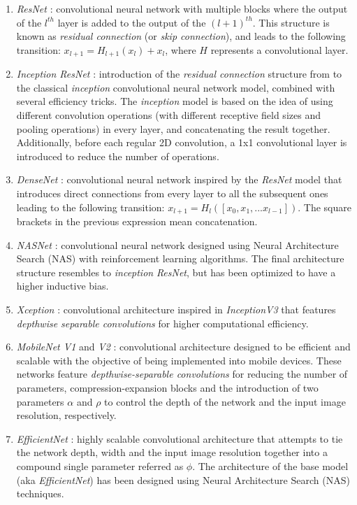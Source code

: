 \documentclass{elsarticle}
\begin{document}
    \begin{enumerate}
    	\item \textit{ResNet} \citep{he2016}: convolutional neural network with multiple blocks where the output of the $l^{th}$ layer is added to the output of the $(l+1)^{th}$. This structure is known as \textit{residual connection} (or \textit{skip connection}), and leads to the following transition: $x_{l+1} = H_{l+1}(x_{l}) + x_l$, where $H$ represents a convolutional layer.
	   	\item \textit{Inception ResNet} \citep{szegedy2017}: introduction of the \textit{residual connection} structure from \citep{he2016} to the classical \textit{inception} convolutional neural network model, combined with several efficiency tricks. The \textit{inception} model is based on the idea of using different convolution operations (with different receptive field sizes and pooling operations) in every layer, and concatenating the result together. Additionally, before each regular 2D convolution, a 1x1 convolutional layer is introduced to reduce the number of operations.
    	\item \textit{DenseNet} \citep{huang2017}: convolutional neural network inspired by the \textit{ResNet} model \citep{he2016} that introduces direct connections from every layer to all the subsequent ones leading to the following transition: $x_{l+1} = H_l([x_0, x_1, ... x_{l-1}])$. The square brackets in the previous expression mean concatenation.
    	\item \textit{NASNet} \citep{pham2018}: convolutional neural network designed using Neural Architecture Search (NAS) with reinforcement learning algorithms. The final architecture structure resembles to \textit{inception} \textit{ResNet}, but has been optimized to have a higher inductive bias.
    	\item \textit{Xception} \citep{chollet2017}: convolutional architecture inspired in \textit{InceptionV3}  \citep{szegedy2016} that features \textit{depthwise separable convolutions} for higher computational efficiency.
    	\item \textit{MobileNet V1} and \textit{V2} \citep{howard2017, sandler2018}: convolutional architecture designed to be efficient and scalable with the objective of being implemented into mobile devices. These networks feature \textit{depthwise-separable convolutions} for reducing the number of parameters, compression-expansion blocks and the introduction of two parameters $\alpha$ and $\rho$ to control the depth of the network and the input image resolution, respectively.
    	\item \textit{EfficientNet} \citep{tan2019}: highly scalable convolutional architecture that attempts to tie the network depth, width and the input image resolution  together into a compound single parameter referred as $\phi$. The architecture of the base model (aka \textit{EfficientNet}) has been designed using Neural Architecture Search (NAS) techniques.
    \end{enumerate}
\end{document}
